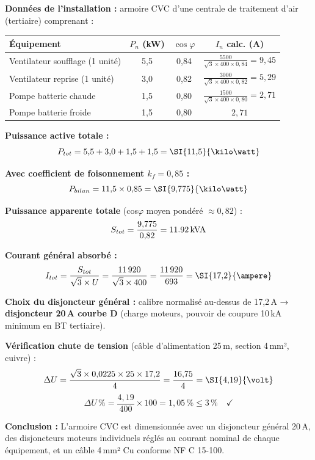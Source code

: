 \begin{exemple}[title={Dimensionnement complet d'une armoire CVC — triphasé 400\,V}]
  \textbf{Données de l'installation :} armoire CVC d'une centrale de traitement d'air (tertiaire) comprenant :
  \begin{center}
    \begin{tabular}{lccc}
      \toprule
      Équipement & $P_n$ (kW) & $\cos\varphi$ & $I_n$ calc. (A) \\
      \midrule
      Ventilateur soufflage (1 unité) & 5{,}5 & 0{,}84 & $\frac{5500}{\sqrt{3}\times400\times0{,}84} = 9{,}45$ \\
      Ventilateur reprise (1 unité)   & 3{,}0 & 0{,}82 & $\frac{3000}{\sqrt{3}\times400\times0{,}82} = 5{,}29$ \\
      Pompe batterie chaude            & 1{,}5 & 0{,}80 & $\frac{1500}{\sqrt{3}\times400\times0{,}80} = 2{,}71$ \\
      Pompe batterie froide            & 1{,}5 & 0{,}80 & $2{,}71$ \\
      \bottomrule
    \end{tabular}
  \end{center}

  \textbf{Puissance active totale :}
  \[
    P_{tot} = 5{,}5 + 3{,}0 + 1{,}5 + 1{,}5 = \SI{11{,}5}{\kilo\watt}
  \]

  \textbf{Avec coefficient de foisonnement $k_f = 0{,}85$ :}
  \[
    P_{bilan} = 11{,}5 \times 0{,}85 = \SI{9{,}775}{\kilo\watt}
  \]

  \textbf{Puissance apparente totale} (cos$\varphi$ moyen pondéré $\approx 0{,}82$) :
  \[
    S_{tot} = \frac{9{,}775}{0{,}82} = \SI{11{,}92}{\text{kVA}}
  \]

  \textbf{Courant général absorbé :}
  \[
    I_{tot} = \frac{S_{tot}}{\sqrt{3} \times U} = \frac{11\,920}{\sqrt{3} \times 400} = \frac{11\,920}{693} = \SI{17{,}2}{\ampere}
  \]

  \textbf{Choix du disjoncteur général :} calibre normalisé au-dessus de 17,2\,A → \textbf{disjoncteur 20\,A courbe D} (charge moteurs, pouvoir de coupure 10\,kA minimum en BT tertiaire).

  \textbf{Vérification chute de tension} (câble d'alimentation 25\,m, section 4\,mm², cuivre) :
  \[
    \Delta U = \frac{\sqrt{3} \times 0{,}0225 \times 25 \times 17{,}2}{4} = \frac{16{,}75}{4} = \SI{4{,}19}{\volt}
  \]
  \[
    \Delta U\,\% = \frac{4{,}19}{400} \times 100 = 1{,}05\,\% \leq 3\,\% \quad \checkmark
  \]

  \textbf{Conclusion :} L'armoire CVC est dimensionnée avec un disjoncteur général 20\,A, des disjoncteurs moteurs individuels réglés au courant nominal de chaque équipement, et un câble 4\,mm² Cu conforme NF C 15-100.
\end{exemple}

